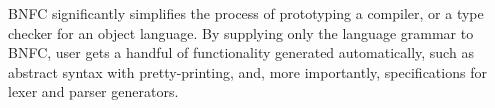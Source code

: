 BNFC significantly simplifies the process of prototyping a compiler, or a type checker for an object language. By supplying only the language grammar to BNFC, user gets a handful of functionality generated automatically, such as abstract syntax with pretty-printing, and, more importantly, specifications for lexer and parser generators.
